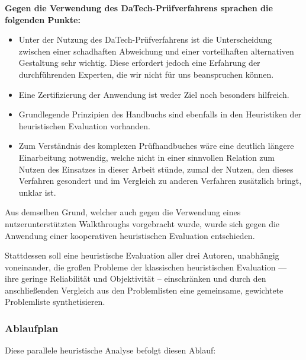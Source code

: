 \documentclass[
  12pt,
  ngerman,
  a4paper,
]{article}
\begin{document}
\textbf{Gegen die Verwendung des DaTech-Prüfverfahrens sprachen die
folgenden Punkte:}

\begin{itemize}
\item
  Unter der Nutzung des DaTech-Prüfverfahrens ist die Unterscheidung
  zwischen einer schadhaften Abweichung und einer vorteilhaften
  alternativen Gestaltung sehr wichtig. Diese erfordert jedoch eine
  Erfahrung der durchführenden Experten, die wir nicht für uns
  beanspruchen können.
\item
  Eine Zertifizierung der Anwendung ist weder Ziel noch besonders
  hilfreich.
\item
  Grundlegende Prinzipien des Handbuchs sind ebenfalls in den
  Heuristiken der heuristischen Evaluation vorhanden.
\item
  Zum Verständnis des komplexen Prüfhandbuches wäre eine deutlich
  längere Einarbeitung notwendig, welche nicht in einer sinnvollen
  Relation zum Nutzen des Einsatzes in dieser Arbeit stünde, zumal der
  Nutzen, den dieses Verfahren gesondert und im Vergleich zu anderen
  Verfahren zusätzlich bringt, unklar ist.
\end{itemize}

Aus demselben Grund, welcher auch gegen die Verwendung eines
nutzerunterstützten Walkthroughs vorgebracht wurde, wurde sich gegen die
Anwendung einer kooperativen heuristischen Evaluation entschieden.

Stattdessen soll eine heuristische Evaluation aller drei Autoren,
unabhängig voneinander, die großen Probleme der klassischen
heuristischen Evaluation --- ihre geringe Reliabilität und Objektivität
-- einschränken und durch den anschließenden Vergleich aus den
Problemlisten eine gemeinsame, gewichtete Problemliste synthetisieren.

\hypertarget{sec:heuristic:plan}{%
\subsubsection{Ablaufplan}\label{sec:heuristic:plan}}

Diese parallele heuristische Analyse befolgt diesen Ablauf:
\end{document}
